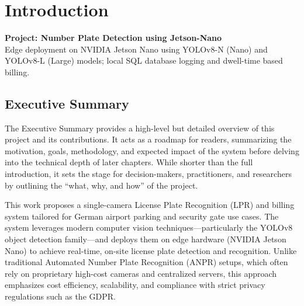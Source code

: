 %
%

	
	\chapter{Introduction}
	\label{ch:intro_expanded}
	
	\begin{center}
		\textbf{Project: Number Plate Detection using Jetson-Nano } \\
		Edge deployment on NVIDIA Jetson Nano using YOLOv8-N (Nano) and YOLOv8-L (Large) models; local SQL database logging and dwell-time based billing.
	\end{center}
	
	\vspace{0.5cm}
	
	\section{Executive Summary}
	The Executive Summary provides a high-level but detailed overview of this project and its contributions. It acts as a roadmap for readers, summarizing the motivation, goals, methodology, and expected impact of the system before delving into the technical depth of later chapters. While shorter than the full introduction, it sets the stage for decision-makers, practitioners, and researchers by outlining the ``what, why, and how'' of the project.
	
	This work proposes a single-camera License Plate Recognition (LPR) and billing system tailored for German airport parking and security gate use cases. The system leverages modern computer vision techniques---particularly the YOLOv8 object detection family---and deploys them on edge hardware (NVIDIA Jetson Nano) to achieve real-time, on-site license plate detection and recognition. Unlike traditional Automated Number Plate Recognition (ANPR) setups, which often rely on proprietary high-cost cameras and centralized servers, this approach emphasizes cost efficiency, scalability, and compliance with strict privacy regulations such as the GDPR.
	
